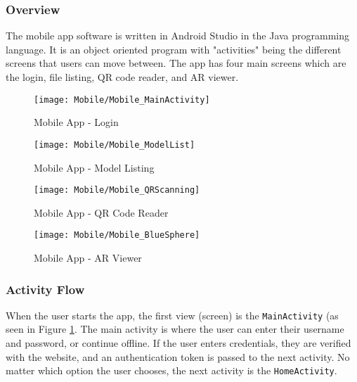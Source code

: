     \subsubsection{Overview}
        
        The mobile app software is written in Android Studio in the Java programming language. It is an object oriented program with "activities" being the different screens that users can move between. The app has four main screens which are the login, file listing, QR code reader, and AR viewer.
        
        \begin{figure}[H]
            \texttt{[image: Mobile/Mobile\_MainActivity]}
            \centering
            \caption{Mobile App - Login}
            \label{fig:mobileLoginActivity}
        \end{figure}

        \begin{figure}[H]
            \texttt{[image: Mobile/Mobile\_ModelList]}
            \centering
            \caption{Mobile App - Model Listing}
            \label{fig:mobileModelList}
        \end{figure}

        \begin{figure}[H]
            \texttt{[image: Mobile/Mobile\_QRScanning]}
            \centering
            \caption{Mobile App - QR Code Reader}
            \label{fig:mobileQRScanning}
        \end{figure}

        \begin{figure}[H]
            \texttt{[image: Mobile/Mobile\_BlueSphere]}
            \centering
            \caption{Mobile App - AR Viewer}
            \label{fig:mobileModelViewer}
        \end{figure}

        \subsubsection{Activity Flow}

            When the user starts the app, the first view (screen) is the \texttt{MainActivity} (as seen in Figure \ref{fig:mobileLoginActivity}.  The main activity is where the user can enter their username and password, or continue offline.  If the user enters credentials, they are verified with the website, and an authentication token is passed to the next activity.  No matter which option the user chooses, the next activity is the \texttt{HomeActivity}.

